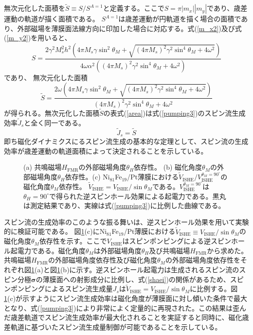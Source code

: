 無次元化した面積を${\tilde S}\equiv S/S^{A=1}$と定義する。ここで$S=\pi |m_x||m_y|$であり、歳差運動の軌道が描く面積である。
$S^{A=1}$は歳差運動が円軌道を描く場合の面積であり、外部磁場を薄膜面法線方向に印加した場合に対応する。式(\ref{m_x2})及び式(\ref{m_y2})を用いると、
\begin{equation}
S= \frac{2\gamma^2 M_s^2 h^2\left(4 \pi  M_s   \gamma  \sin ^2\theta_M+\sqrt{(4 \pi
 M_s)^2 \gamma ^2 \sin ^4\theta_M+4 \omega ^2}\right)}{4\omega\alpha^2\left((4 \pi  M_s)^2 \gamma ^2 \sin ^4\theta_M+4 \omega ^2\right)}\label{areaA}
\end{equation}
であり、
無次元化した面積
\begin{equation}
{\tilde S}= \frac{2\omega\left(4 \pi  M_s   \gamma  \sin ^2\theta_M+\sqrt{(4 \pi
 M_s)^2 \gamma ^2 \sin ^4\theta_M+4 \omega ^2}\right)}{(4 \pi  M_s)^2 \gamma ^2 \sin ^4\theta_M+4 \omega ^2}\label{area}
\end{equation}
が得られる。無次元化した面積${\tilde S}$の表式(\ref{area})は式(\ref{pumping3})のスピン流生成効率${\tilde J}_s$と全く同一である。
\begin{equation}
{\tilde J_s}={\tilde S}
\end{equation}即ち磁化ダイナミクスにるスピン流生成の基本的な定理として、スピン流の生成効率が歳差運動の軌道面積によって決定されることを示している。




\begin{figure}[tbp]
\centerline{
}
\caption{(a) 共鳴磁場$H_\text{FMR}$の外部磁場角度$\theta_H$依存性。
(b) 磁化角度$\theta_M$の外部磁場角度$\theta_H$依存性。(c) Ni$_{81}$Fe$_{19}$/Pt薄膜における$\tilde{V}_\text{ISHE}/V_\text{ISHE}^{\theta_M=90^\circ}$の磁化角度$\theta_M$依存性。 $\tilde{V}_\text{ISHE}=V_\text{ISHE}/\sin\theta_M$である。$V_\text{ISHE}^{\theta_M=90^\circ}$は$\theta_H=90^\circ$で得られた逆スピンホール効果による起電力である。黒丸は測定結果であり、実線は式(\ref{pumping3})に比例した曲線である。 
}
\label{opt} 
\end{figure}



スピン流の生成効率のこのような振る舞いは、逆スピンホール効果を用いて実験的に検証可能である。
図\ref{opt}(c)にNi$_{81}$Fe$_{19}$/Pt薄膜における$\tilde{V}_\text{ISHE}\equiv V_\text{ISHE}/\sin\theta_M$の磁化角度$\theta_M$依存性を示す。ここで$V_\text{ISHE}$はスピンポンピングによる逆スピンホール起電力である。磁化角度$\theta_M$は外部磁場角度$\theta_H$及び共鳴磁場$H_\text{FMR}$から求めた。共鳴磁場$H_\text{FMR}$の外部磁場角度依存性及び磁化角度$\theta_M$の外部磁場角度依存性をそれぞれ図\ref{opt}(a)と図\ref{opt}(b)に示す。逆スピンホール起電力は生成されるスピン流のスピン分極$\bm{\sigma}$の薄膜面への射影成分に比例し、式(\ref{shaei})の関係があるため、スピンポンピングによるスピン流生成量$J_s$は$\tilde{V}_\text{ISHE}=V_\text{ISHE}/\sin\theta_M$に比例する。図\ref{opt}(c)が示すようにスピン流生成効率は磁化角度が薄膜面に対し傾いた条件で最大となり、式(\ref{pumping3})により非常によく定量的に再現された。この結果は歪んだ歳差軌道でスピン流生成効率が最大化されることを実証すると同時に、磁化歳差軌道に基づいたスピン流生成量制御が可能であることを示している。






